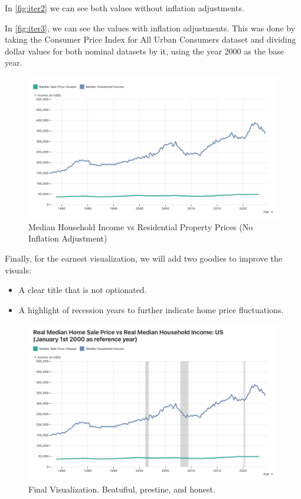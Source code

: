 \documentclass{article}
\begin{document}
In \autoref{fig:iter2} we can see both values without inflation adjustments.

In \autoref{fig:iter3}, we can see the values with inflation adjustments. 
This was done by taking the Consumer Price Index for All Urban Consumers dataset 
and dividing dollar values for both nominal datasets by it, using the year 2000 as the base year.

\begin{figure}[ht] 
  \centering
  \includegraphics[width=.75\textwidth]{figs/iter3.png}
  \caption{
      Median Household Income vs Residential Property Prices (No Inflation Adjustment)
  }
  \label{fig:iter3}
\end{figure}

Finally, for the earnest visualization, we will add two goodies to improve the visuals:
\begin{itemize}
  \item A clear title that is not optionated.
  \item A highlight of recession years to further indicate home price fluctuations.
\end{itemize}

\begin{figure}[ht] 
  \centering
  \includegraphics[width=.75\textwidth]{figs/iter4.png}
  \caption{
      Final Visualization. Beatufiul, prestine, and honest.
  }
  \label{fig:iter4}
\end{figure}
\end{document}
